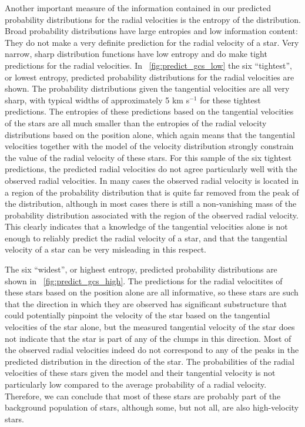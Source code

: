 Another important measure of the information contained in our
predicted probability distributions for the radial velocities is the
entropy of the distribution. Broad probability distributions have
large entropies and low information content: They do not make a very
definite prediction for the radial velocity of a star. Very narrow,
sharp distribution functions have low entropy and do make tight
predictions for the radial velocities. In
\figurename~\ref{fig:predict_gcs_low} the six ``tightest'', or lowest
entropy, predicted probability distributions for the radial velocities
are shown. The probability distributions given the tangential
velocities are all very sharp, with typical widths of approximately 5
km s$^{-1}$ for these tightest predictions. The entropies of these
predictions based on the tangential velocities of the stars are all
much smaller than the entropies of the radial velocity distributions
based on the position alone, which again means that the tangential
velocities together with the model of the velocity distribution
strongly constrain the value of the radial velocity of these
stars. For this sample of the six tightest predictions, the predicted
radial velocities do not agree particularly well with the observed
radial velocities. In many cases the observed radial velocity is
located in a region of the probability distribution that is quite far
removed from the peak of the distribution, although in most cases
there is still a non-vanishing mass of the probability distribution
associated with the region of the observed radial velocity. This
clearly indicates that a knowledge of the tangential velocities alone
is not enough to reliably predict the radial velocity of a star, and
that the tangential velocity of a star can be very misleading in this
respect.

The six ``widest'', or highest entropy, predicted probability
distributions are shown in \figurename~\ref{fig:predict_gcs_high}. The
predictions for the radial velocitites of these stars based on the
position alone are all informative, so these stars are such that the
direction in which they are observed has significant substructure that
could potentially pinpoint the velocity of the star based on the
tangential velocities of the star alone, but the measured tangential
velocity of the star does not indicate that the star is part of any of
the clumps in this direction. Most of the observed radial velocities
indeed do not correspond to any of the peaks in the predicted
distribution in the direction of the star. The probabilities of the
radial velocities of these stars given the model and their tangential
velocity is not particularly low compared to the average probability
of a radial velocity. Therefore, we can conclude that most of these
stars are probably part of the background population of stars,
although some, but not all, are also high-velocity stars.

